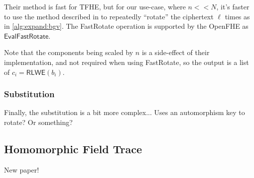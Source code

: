 Their method is fast for TFHE, but for our use-case, where $n << N$, it's faster to use the method described in \cite{cryptoeprint:2018/244} to repeatedly ``rotate'' the ciphertext $\ell$ times as in \autoref{alg:expand:bgv}. The FastRotate operation is supported by the OpenFHE as $\mathsf{EvalFastRotate}$.

Note that the components being scaled by $n$ is a side-effect of their implementation, and not required when using FastRotate, so the output is a list of $c_i =\mathsf{RLWE}(b_i)$.




\ifnotes
    \subsubsection{Substitution}
    Finally, the substitution is a bit more complex... Uses an automorphism key to rotate? Or something?
    
    
\fi


\ifnotes
    \subsection{Homomorphic Field Trace}
    New paper!
\fi